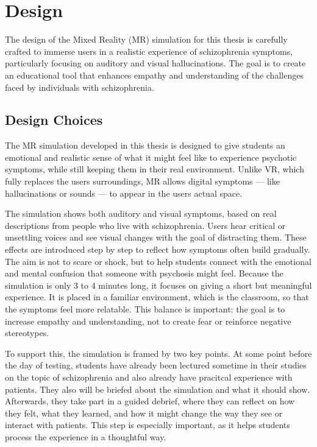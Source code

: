\chapter{Design}
\label{ch:design}

The design of the Mixed Reality (MR) simulation for this thesis is carefully crafted to immerse users in a realistic experience of schizophrenia symptoms, particularly focusing on auditory and visual hallucinations. The goal is to create an educational tool that enhances empathy and understanding of the challenges faced by individuals with schizophrenia.

\section{Design Choices}

The MR simulation developed in this thesis is designed to give students an emotional and realistic sense of what it might feel like to experience psychotic symptoms, while still keeping them in their real environment. Unlike VR, which fully replaces the users surroundings, MR allows digital symptoms — like hallucinations or sounds — to appear in the users actual space. %

\vspace{1em}

The simulation shows both auditory and visual symptoms, based on real descriptions from people who live with schizophrenia. Users hear critical or unsettling voices and see visual changes with the goal of distracting them. These effects are introduced step by step to reflect how symptoms often build gradually. The aim is not to scare or shock, but to help students connect with the emotional and mental confusion that someone with psychosis might feel. Because the simulation is only 3 to 4 minutes long, it focuses on giving a short but meaningful experience. It is placed in a familiar environment, which is the classroom, so that the symptoms feel more relatable. This balance is important: the goal is to increase empathy and understanding, not to create fear or reinforce negative stereotypes. %

\vspace{1em}

To support this, the simulation is framed by two key points. At some point before the day of testing, students have already been lectured sometime in their studies on the topic of schizophrenia and also already have pracitcal experience with patients. They also will be briefed about the simulation and what it should show. Afterwards, they take part in a guided debrief, where they can reflect on how they felt, what they learned, and how it might change the way they see or interact with patients. This step is especially important, as it helps students process the experience in a thoughtful way.

